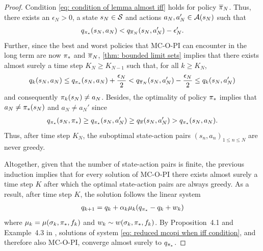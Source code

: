 \begin{proof}
Condition \eqref{eq: condition of lemma almost iff} holds for policy $\overline{\pi}_N$.
Thus, there exists an $\epsilon_N >0$, a state $s_N \in \mathcal{S}$ and actions $a_N, a_N' \in \mathcal{A}(s_N)$ such that
\begin{align*}
    q_{{\pi}_*}(s_N, a_N)
    < q_{\overline{\pi}_N}(s_N, a_N' ) - \epsilon_N' .
\end{align*}
Further, since the best and worst policies that MC-O-PI can encounter in the long term are now ${\pi}_*$ and $\overline{\pi}_N$,
\autoref{thm: bounded limit sets} implies that
there exists almost surely a time step $K_N \geq K_{N-1}$ such that, for all $k \geq K_N$,
\begin{align*}
    q_k(s_N, a_N)
    \leq
    q_{{\pi}_*}(s_N, a_N) + \frac{\epsilon_N}{2}
    <
    q_{\overline{\pi}_N}(s_N, a_N') - \frac{\epsilon_N}{2}
    \leq
    q_k(s_N, a_N')
\end{align*}
and consequently $\pi_k(s_N) \neq a_N$.
Besides, the optimality of policy ${\pi}_*$ implies that 
$a_N \neq {\pi}_*(s_N)$ and $a_N \neq a_N'$
since
\begin{align*}
    q_{{\pi}_*}(s_N, {\pi}_*) 
    \geq q_{{\pi}_*}(s_N, a_N')
    \geq q_{\overline{\pi}}(s_N, a_N')
    > q_{{\pi}_*}(s_N, a_N) .
\end{align*}
Thus, after time step $K_N$, the suboptimal state-action pairs $( s_n, a_n )_{1 \leq n \leq N}$ are never greedy.


Altogether, given that the number of state-action pairs is finite, the previous induction implies that for every solution of MC-O-PI there exists almost surely a time step $K$ after which the optimal state-action pairs are always greedy.
As a result, after time step $K$, the solution follows the linear system
\begin{align}
\label{eq: reduced mcopi when iff condition}
    q_{{k+1}} 
    =
    q_k + \alpha_k \mu_k (q_{{\pi}_*} - q_k + w_k)
\end{align}
where $\mu_k = \mu(\sigma_k, {\pi}_*, f_k)$ and $w_k \sim w(\sigma_k, {\pi}_*, f_k)$.
By Proposition~4.1 and Example~4.3 in \citep{Bertsekas1996Neuro-DynamicProgramming}, solutions of system \eqref{eq: reduced mcopi when iff condition}, and therefore also MC-O-PI, converge almost surely to $q_{{\pi}_*}$.
\end{proof}

